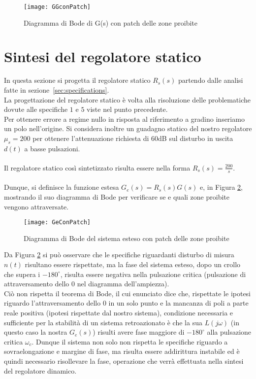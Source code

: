 \documentclass[a4paper, 11pt]{article}
\begin{document}
\begin{figure}[h]
	\centering
	\texttt{[image: GGconPatch]}
	\caption[]{Diagramma di Bode di G(s) con patch delle zone proibite}
	\label{Figura 2}
\end{figure}

\section{Sintesi del regolatore statico}
\label{sec:static_regulator}


In questa sezione si progetta il regolatore statico $R_s(s)$ partendo dalle analisi fatte in sezione~\ref{sec:specifications}.\\
La progettazione del regolatore statico è volta alla risoluzione delle problematiche dovute alle specifiche $1$ e $5$ viste nel punto precedente.\\
Per ottenere errore a regime nullo in risposta al riferimento a gradino inseriamo un polo nell'origine. Si considera inoltre un guadagno statico del nostro regolatore $\mu_s=200$ per ottenere l'attenuazione richiesta di 60dB sul disturbo in uscita $d(t)$ a basse pulsazioni.
\\
\\
Il regolatore statico così sintetizzato risulta essere nella forma $R_s(s)=\frac{200}{s}$.\\
\\
Dunque, si definisce la funzione estesa $G_e(s) = R_s(s)G(s)$ e, in Figura \ref{Figura 3}, mostrando il suo diagramma di Bode per verificare se e quali zone proibite vengono attraversate.

\begin{figure}[H]
	\centering
	\texttt{[image: GeConPatch]}
	\caption[]{Diagramma di Bode del sistema esteso con patch delle zone proibite}
	\label{Figura 3}
\end{figure}


Da Figura \ref{Figura 3} si può osservare che le specifiche riguardanti disturbo di misura $n(t)$ risultano essere rispettate, ma la fase del sistema esteso, dopo un crollo che supera i $-180^{\circ}$, risulta essere negativa nella pulsazione critica (pulsazione di attraversamento dello 0 nel diagramma dell'ampiezza).\\
Ciò non rispetta il teorema di Bode, il cui enunciato dice che, rispettate le ipotesi riguardo l'attraversamento dello 0 in un solo punto e la mancanza di poli a parte reale positiva (ipotesi rispettate dal nostro sistema), condizione necessaria e sufficiente per la stabilità di un sistema retroazionato è che la sua $L(j\omega)$ (in questo caso la nostra $G_e(s)$) risulti avere fase maggiore di $-180^{\circ}$ alla pulsazione critica $\omega_c$.
Dunque il sistema non solo non rispetta le specifiche riguardo a sovraelongazione e margine di fase, ma risulta essere addirittura instabile ed è quindi necessario risollevare la fase, operazione che verrà effettuata nella sintesi del regolatore dinamico.  
\end{document}
